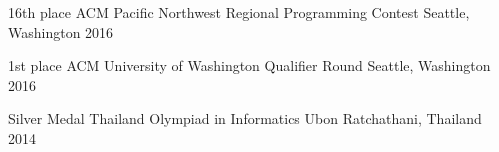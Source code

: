 
\begin{cvhonors}

  \cvhonor
    {16th place} %
    {ACM Pacific Northwest Regional Programming Contest} %
    {Seattle, Washington} %
    {2016} %

  \cvhonor
    {1st place} %
    {ACM University of Washington Qualifier Round} %
    {Seattle, Washington} %
    {2016} %

  \cvhonor
    {Silver Medal} %
    {Thailand Olympiad in Informatics} %
    {Ubon Ratchathani, Thailand} %
    {2014} %

\end{cvhonors}
